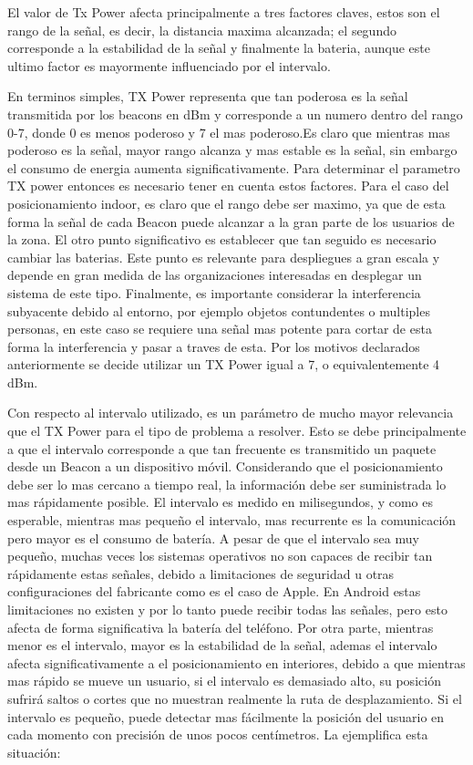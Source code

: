 El valor de Tx Power afecta principalmente a tres factores claves, estos son el rango de la señal, es decir, la distancia maxima alcanzada; el segundo corresponde a la estabilidad de la señal y finalmente la bateria, aunque este ultimo factor es mayormente influenciado por el intervalo.

En terminos simples, TX Power representa que tan poderosa es la señal transmitida por los beacons en dBm y corresponde a un numero dentro del rango 0-7, donde 0 es menos poderoso y 7 el mas poderoso.Es claro que mientras mas poderoso es la señal, mayor rango alcanza y mas estable es la señal, sin embargo el consumo de energia aumenta significativamente. Para determinar el parametro TX power entonces es necesario tener en cuenta estos factores. Para el caso del posicionamiento indoor, es claro que el rango debe ser maximo, ya que de esta forma la señal de cada Beacon puede alcanzar a la gran parte de los usuarios de la zona. El otro punto significativo es establecer que tan seguido es necesario cambiar las baterias. Este punto es relevante para despliegues a gran escala y depende en gran medida de las organizaciones interesadas en desplegar un sistema de este tipo. Finalmente, es importante considerar la interferencia subyacente debido al entorno, por ejemplo objetos contundentes o multiples personas, en este caso se requiere una señal mas potente para cortar de esta forma la interferencia y pasar a traves de esta. Por los motivos declarados anteriormente se decide utilizar un TX Power igual a 7, o equivalentemente 4 dBm.

Con respecto al intervalo utilizado, es un parámetro de mucho mayor relevancia que el TX Power para el tipo de problema a resolver. Esto se debe principalmente a que el intervalo corresponde a que tan frecuente es transmitido un paquete desde un Beacon a un dispositivo móvil. Considerando que el posicionamiento debe ser lo mas cercano a  tiempo real, la información debe ser suministrada lo mas rápidamente posible. El intervalo es medido en milisegundos, y como es esperable, mientras mas pequeño el intervalo, mas recurrente es la comunicación pero mayor es el consumo de batería. A pesar de que el intervalo sea muy pequeño, muchas veces los sistemas operativos no son capaces de recibir tan rápidamente estas señales, debido a limitaciones de seguridad u otras configuraciones del fabricante como es el caso de Apple. En Android estas limitaciones no existen y por lo tanto puede recibir todas las señales, pero esto afecta de forma significativa la batería del teléfono. Por otra parte, mientras menor es el intervalo, mayor es la estabilidad de la señal, ademas el intervalo afecta significativamente a el posicionamiento en interiores, debido a que mientras mas rápido se mueve un usuario, si el intervalo es demasiado alto, su posición sufrirá saltos o cortes que no muestran realmente la ruta de desplazamiento. Si el intervalo es pequeño, puede detectar mas fácilmente la posición del usuario en cada momento con precisión de unos pocos centímetros. La  ejemplifica esta situación:


